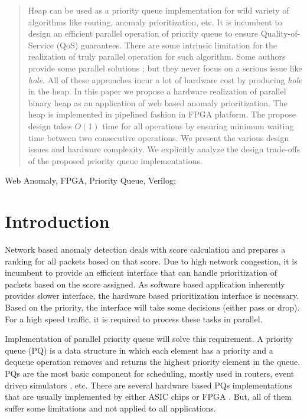 \documentclass[10pt, conference, compsocconf]{IEEEtran}
\begin{document}
\begin{abstract}
Heap can be used as a priority queue implementation for wild variety of algorithms like routing, anomaly prioritization, etc. It is incumbent to design an efficient parallel operation of priority queue to ensure Quality-of-Service (QoS) guarantees. There are some intrinsic limitation for the realization of truly parallel operation for such algorithm. Some authors provide some parallel solutions \cite{fpga1,fpga2,fpga3}; but they never focus on a serious issue like {\it hole}. All of these approaches incur a lot of hardware cost by producing {\it hole} in the heap. In this paper we propose a hardware realization of parallel binary heap as an application of web based anomaly prioritization. The heap is implemented in pipelined fashion in FPGA platform. The propose design takes $O(1)$ time for all operations by ensuring minimum waiting time between two consecutive operations. We present the various design issues and hardware complexity. We explicitly analyze the design trade-offs of the proposed priority queue implementations.

\end{abstract}

\begin{IEEEkeywords}
Web Anomaly, FPGA, Priority Queue, Verilog;

\end{IEEEkeywords}


\IEEEpeerreviewmaketitle



\section{Introduction}
Network based anomaly detection deals with score calculation and prepares a ranking for all packets based on that score. Due to high network congestion, it is incumbent to provide an efficient interface that can handle prioritization of packets based on the score assigned. As software based application inherently provides slower interface, the hardware based prioritization interface is necessary. Based on the priority, the interface will take some decisions (either pass or drop). For a high speed traffic, it is required to process these tasks in parallel.

Implementation of parallel priority queue will solve this requirement. A priority queue (PQ) is a data structure in which each element has a priority and a dequeue operation removes and returns the highest priority element in the queue. PQs are the most basic component for scheduling, mostly used in routers, event driven simulators \cite{fpga1}, etc. There are several hardware based PQs implementations that  are usually implemented by either ASIC chips \cite{hw1,hw2,hw9} or FPGA \cite{fpga1,fpga2,fpga3}. But, all of them suffer some limitations and not applied to all applications.
\end{document}
